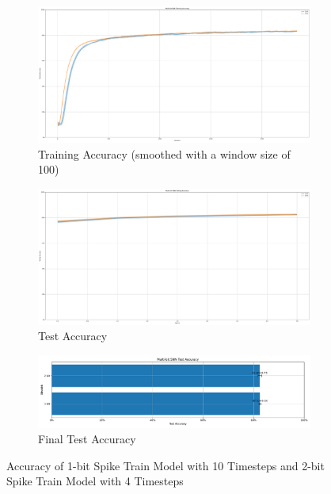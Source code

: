         \begin{figure}[H]
            \centering
            \begin{subfigure}[H]{0.48\textwidth}
                \includegraphics[width=\textwidth]{../timesteps/FashionMNIST/plots/fashionmnist_train_acc.pdf}
                \caption{Training Accuracy (smoothed with a window size of 100)}
            \end{subfigure}
            \hfill
            \begin{subfigure}[H]{0.48\textwidth}
                \includegraphics[width=\textwidth]{../timesteps/FashionMNIST/plots/fashionmnist_test_acc.pdf}
                \caption{Test Accuracy}
            \end{subfigure}
            \hfill
            \begin{subfigure}[H]{\textwidth}
                \includegraphics[width=\textwidth]{../timesteps/FashionMNIST/plots/fashionmnist_final_acc.pdf}
                \caption{Final Test Accuracy}
            \end{subfigure}
            \caption{Accuracy of 1-bit Spike Train Model with 10 Timesteps and 2-bit Spike Train Model with 4 Timesteps}
        \end{figure}

